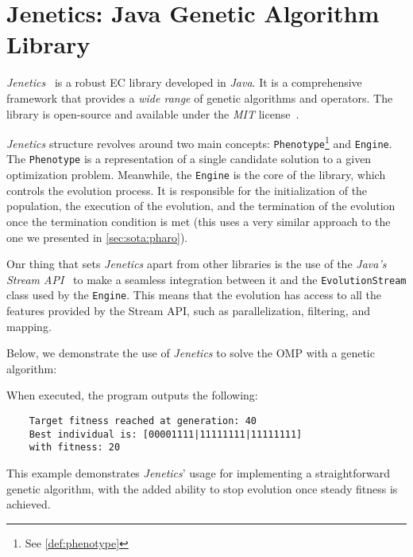 \section{Jenetics: Java Genetic Algorithm Library}
\label{sec:sota:jenetics}

  \emph{Jenetics}~\autocite{wilhelmstotterJeneticsJavaGenetica} is a robust
  EC library developed in \textit{Java}.
  It is a comprehensive framework that provides a \textit{wide range} of genetic
  algorithms and operators.
  The library is open-source and available under the \textit{MIT} 
  license~\autocite{MITLicense2006}.

  \textit{Jenetics} structure revolves around two main concepts: 
  \texttt{Phenotype}\footnote{See \vref{def:phenotype}} and \texttt{Engine}.
  The \texttt{Phenotype} is a representation of a single candidate solution to
  a given optimization problem.
  Meanwhile, the \texttt{Engine} is the core of the library, which controls the
  evolution process.
  It is responsible for the initialization of the population, the execution of
  the evolution, and the termination of the evolution once the termination
  condition is met (this uses a very similar approach to the one we presented 
  in \vref{sec:sota:pharo}).

  Onr thing that sets \textit{Jenetics} apart from other libraries is the use 
  of the \textit{Java's Stream API}~\autocite{StreamJavaPlatform} to make a 
  seamless integration between it and the \texttt{EvolutionStream} class used 
  by the \texttt{Engine}.
  This means that the evolution has access to all the features provided by the
  Stream API, such as parallelization, filtering, and mapping.

  Below, we demonstrate the use of \textit{Jenetics} to solve the OMP with a 
  genetic algorithm:

  

  When executed, the program outputs the following:

  \begin{verbatim}
    Target fitness reached at generation: 40
    Best individual is: [00001111|11111111|11111111]
    with fitness: 20
  \end{verbatim}

  This example demonstrates \textit{Jenetics}' usage for implementing a straightforward
  genetic algorithm, with the added ability to stop evolution once steady
  fitness is achieved.

